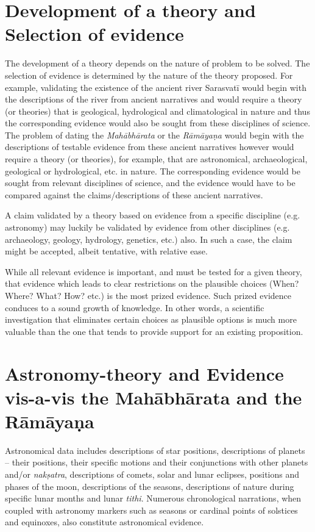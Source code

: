 \vspace{-.3cm}

\section*{Development of a theory and Selection of evidence}

The development of a theory depends on the nature of problem to be solved. The selection of evidence is determined by the nature of the theory proposed. For example, validating the existence of the ancient river Sarasvatī would begin with the descriptions of the river from ancient narratives and would require a theory (or theories) that is geological, hydrological and climatological in nature and thus the corresponding evidence would also be sought from these disciplines of science. The problem of dating the \textit{Mahābhārata} or the \textit{Rāmāyaṇa} would begin with the descriptions of testable evidence from these ancient narratives however would require a theory (or theories), for example, that are astronomical, archaeological, geological or hydrological, etc. in nature. The corresponding evidence would be sought from relevant disciplines of science, and the evidence would have to be compared against the claims/descriptions of these ancient narratives.

A claim validated by a theory based on evidence from a specific discipline (e.g. astronomy) may luckily be validated by evidence from other disciplines (e.g. archaeology, geology, hydrology, genetics, etc.) also. In such a case, the claim might be accepted, albeit tentative, with relative ease.

While all relevant evidence is important, and must be tested for a given theory, that evidence which leads to clear restrictions on the plausible choices (When? Where? What? How? etc.) is the most prized evidence. Such prized evidence conduces to a sound growth of knowledge. In other words, a scientific investigation that eliminates certain choices as plausible options is much more valuable than the one that tends to provide support for an existing proposition.

\vspace{-.3cm}

\section*{Astronomy-theory and Evidence vis-a-vis the Mahābhārata and the Rāmāyaṇa}

Astronomical data includes descriptions of star positions, descriptions of planets – their positions, their specific motions and their conjunctions with other planets and/or \textit{nakṣatra}, descriptions of comets, solar and lunar eclipses, positions and phases of the moon, descriptions of the seasons, descriptions of nature during specific lunar months and lunar \textit{tithi}. Numerous chronological narrations, when coupled with astronomy markers such as seasons or cardinal points of solstices and equinoxes, also constitute astronomical evidence.

